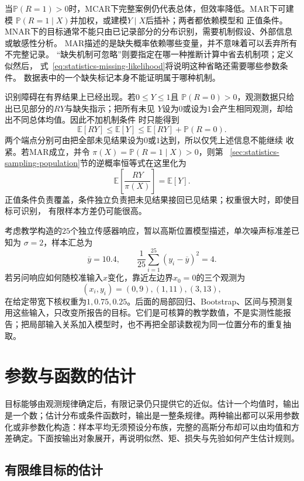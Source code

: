 当\(\mathbb{P}(R=1)>0\)时，MCAR下完整案例仍代表总体，但效率降低。MAR下可建模
\(\mathbb{P}(R=1\mid X)\)并加权，或建模\(Y\mid X\)后插补；两者都依赖模型和
正值条件。MNAR下的目标通常不能只由已记录部分的分布识别，需要机制假设、外部信息或敏感性分析。
MAR描述的是缺失概率依赖哪些变量，并不意味着可以丢弃所有不完整记录。
“缺失机制可忽略”则要指定在哪一种推断计算中省去机制项；定义似然后，
式~\eqref{eq:statistics-missing-likelihood}将说明这种省略还需要哪些参数条件。
数据表中的一个缺失标记本身不能证明属于哪种机制。

识别障碍在有界结果上已经出现。若\(0\leq Y\leq1\)且
\(\mathbb{P}(R=0)>0\)，观测数据只给出已见部分的\(RY\)与缺失指示；把所有未见
\(Y\)设为\(0\)或设为\(1\)会产生相同观测，却给出不同总体均值。因此不加机制条件
时只能得到
\[
  \mathbb{E}[RY]
  \leq\mathbb{E}[Y]
  \leq\mathbb{E}[RY]+\mathbb{P}(R=0).
\]
两个端点分别可由把全部未见结果设为\(0\)或\(1\)达到，所以仅凭上述信息不能继续
收紧。若MAR成立，并令
\(\pi(X)=\mathbb{P}(R=1\mid X)>0\)，则第
~\ref{sec:statistics-sampling-population}节的逆概率恒等式在这里化为
\[
  \mathbb{E}\left[\frac{RY}{\pi(X)}\right]
  =\mathbb{E}[Y].
\]
正值条件负责覆盖，条件独立负责把未见结果接回已见结果；权重很大时，即使目标可识别，
有限样本方差仍可能很高。
\begin{example}[贯穿本章的传感器校准数据]
\label{ex:statistics-running-sensor-calibration}
考虑教学构造的\(25\)个独立传感器响应，暂以高斯位置模型描述，单次噪声标准差已知为
\(\sigma=2\)，样本汇总为
\[
\overline y=10.4,\qquad
\frac1{25}\sum_{i=1}^{25}(y_i-\overline y)^2=4.
\]
若另问响应如何随校准输入\(x\)变化，靠近左边界\(x_0=0\)的三个观测为
\[
(x_i,y_i)=(0,9),(1,11),(3,13),
\]
在给定带宽下核权重为\(1,0.75,0.25\)。后面的局部回归、Bootstrap、区间与预测复用这些输入，只改变所报告的目标。它们是可核算的教学数值，不是实测性能报告；把局部输入关系加入模型时，也不再把全部读数视为同一位置分布的重复抽取。
\end{example}

\section{参数与函数的估计}
\label{sec:stats-parameter-inference-efficiency}
目标能够由观测规律确定后，有限记录仍只提供它的近似。估计一个均值时，输出是一个数；估计分布或条件函数时，输出是一整条规律。两种输出都可以采用参数化或非参数化构造：样本平均无须预设分布族，完整的高斯分布却可以由均值和方差确定。下面按输出对象展开，再说明似然、矩、损失与先验如何产生估计规则。

\subsection{有限维目标的估计}
